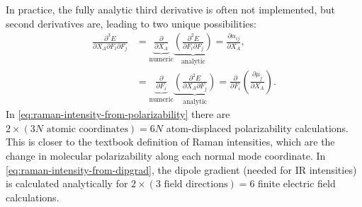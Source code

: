 \documentclass[%
class = book,%
crop = false,%
float = true,%
multi = true,%
preview = false,%
]{standalone}
\let\cite\autocite
\begin{document}
In practice, the fully analytic third derivative is often not implemented, but second derivatives are, leading to two unique possibilities:
\begin{align}
  \label{eq:raman-intensity-from-polarizability}
  \frac{\partial^{3} E}{\partial X_{A} \partial F_{i} \partial F_{j}} &= \underbrace{\frac{\partial}{\partial X_{A}}}_{\text{numeric}} \underbrace{\left(\frac{\partial^{2} E}{\partial F_{i} \partial F_{j}}\right)}_{\text{analytic}} = \frac{\partial \alpha_{ij}}{\partial X_{A}}, \\
  \label{eq:raman-intensity-from-dipgrad}
  &= \underbrace{\frac{\partial}{\partial F_{i}}}_{\text{numeric}} \underbrace{\left(\frac{\partial^{2} E}{\partial X_{A} \partial F_{j}}\right)}_{\text{analytic}} = \frac{\partial}{\partial F_{i}} \left( \frac{\partial \mu_{j}}{\partial X_{A}} \right).
\end{align}
In \eqref{eq:raman-intensity-from-polarizability} there are \(2 \times (3N \,\,\text{atomic coordinates}) = 6N\) atom-displaced polarizability calculations. This is closer to the textbook definition of Raman intensities, which are the change in molecular polarizability along each normal mode coordinate\cite{doi:10.1080/00268978000103541}. In \eqref{eq:raman-intensity-from-dipgrad}, the dipole gradient (needed for IR intensities) is calculated analytically for \(2 \times (3 \,\,\text{field directions}) = 6\) finite electric field calculations.

\subsection{\texorpdfstring{\href{https://chemistry.stackexchange.com/q/80335/194}{\color{black}{Finite difference for numerical derivatives}}}{Finite difference for numerical derivatives}}
\label{ssec:finite-difference-for-numerical-derivatives}
\end{document}
